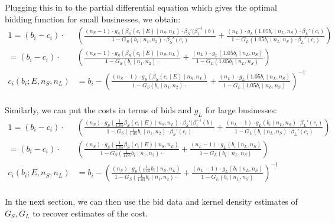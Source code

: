 Plugging this in to the partial differential equation which gives the optimal
bidding function for small businesses, we obtain:
\[
  \begin{aligned}
    1 = (b_i - c_i) \cdot & \left(
    \frac{(n_S - 1) \cdot g_S(\beta_S(c_i \mid E) \mid n_S, n_L) \cdot \beta_S'(\beta_1^{-1}(b)}{1 - G_S(b_i \mid n_1, n_2) \cdot \beta_S'(c_i)} +
    \frac{(n_L) \cdot g_L(1.05 b_i \mid n_L, n_S) \cdot \beta_L'(c_i)}{1 - G_L(1.05 b_i \mid n_L, n_S) \cdot \beta_L'(c_i)} \right) \\
  = (b_i - c_i) \cdot & \left(
    \frac{(n_S - 1) \cdot g_S(\beta_S(c_i \mid E) \mid n_S, n_L)}{1 - G_S(b_i \mid n_1, n_2) \cdot} +
    \frac{(n_L) \cdot g_L(1.05 b_i \mid n_L, n_S)}{1 - G_L(1.05 b_i \mid n_L, n_S)} \right) \\
  c_i(b_i; E, n_S, n_L) &= b_i - \left(\frac{(n_S - 1) \cdot g_S(\beta_S(c_i \mid E) \mid n_S, n_L)}{1 - G_S(b_i \mid n_1, n_2) \cdot} +
    \frac{(n_L) \cdot g_L(1.05 b_i \mid n_L, n_S)}{1 - G_L(1.05 b_i \mid n_L, n_S)} \right)^{-1} \\
  \end{aligned}
\]

Similarly, we can put the costs in terms of bids and \(g_L\) for large businesses:
\[
  \begin{aligned}
    1 = (b_i - c_i) \cdot & \left(
    \frac{(n_S) \cdot g_S(\frac{1}{1.05} \beta_S(c_i \mid E) \mid n_S, n_L) \cdot \beta_S'(\beta_1^{-1}(b)}{1 - G_S(\frac{1}{1.05} b_i \mid n_1, n_2) \cdot \beta_S'(c_i)} +
    \frac{(n_L - 1) \cdot g_L(b_i \mid n_L, n_S) \cdot \beta_L'(c_i)}{1 - G_L(b_i \mid n_L, n_S) \cdot \beta_L'(c_i)} \right) \\
  = (b_i - c_i) \cdot & \left(
    \frac{(n_S) \cdot g_S(\frac{1}{1.05} \beta_S(c_i \mid E) \mid n_S, n_L)}{1 - G_S(\frac{1}{1.05} b_i \mid n_1, n_2) \cdot} +
    \frac{(n_L - 1) \cdot g_L(b_i \mid n_L, n_S)}{1 - G_L(b_i \mid n_L, n_S)} \right) \\
  c_i(b_i; E, n_S, n_L) &= b_i - \left(\frac{(n_S) \cdot g_S(\frac{1}{1.05} b_i \mid n_S, n_L)}{1 - G_S(\frac{1}{1.05} b_i \mid n_1, n_2) \cdot} +
    \frac{(n_L - 1) \cdot g_L(b_i \mid n_L, n_S)}{1 - G_L(b_i \mid n_L, n_S)} \right)^{-1} \\
  \end{aligned}
\]

In the next section, we can then use the bid data and kernel density estimates of \(G_S, G_L\) to
recover estimates of the cost.

